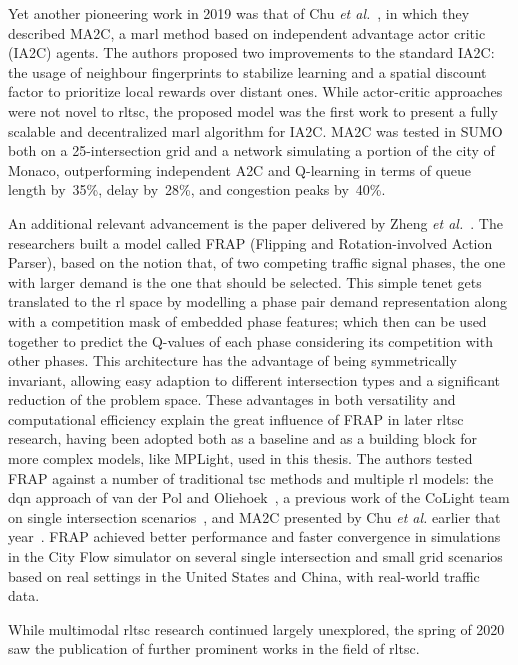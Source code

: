 Yet another pioneering work in 2019 was that of Chu \textit{et al.}~\cite{Chu2019}, in which they described MA2C, a \gls{marl} method based on independent advantage actor critic (IA2C) agents. The authors proposed two improvements to the standard IA2C: the usage of neighbour fingerprints to stabilize learning and a spatial discount factor to prioritize local rewards over distant ones. While actor-critic approaches were not novel to \gls{rltsc}, the proposed model was the first work to present a fully scalable and decentralized \gls{marl} algorithm for IA2C. MA2C was tested in SUMO both on a 25-intersection grid and a network simulating a portion of the city of Monaco, outperforming independent A2C and Q-learning in terms of queue length by~35\%, delay by~28\%, and congestion peaks by~40\%.

An additional relevant advancement is the paper delivered by Zheng \textit{et al.}~\cite{Zheng2019}. The researchers built a model called FRAP (Flipping and Rotation-involved Action Parser), based on the notion that, of two competing traffic signal phases, the one with larger demand is the one that should be selected. This simple tenet gets translated to the \gls{rl} space by modelling a phase pair demand representation along with a competition mask of embedded phase features; which then can be used together to predict the Q-values of each phase considering its competition with other phases. This architecture has the advantage of being symmetrically invariant, allowing easy adaption to different intersection types and a significant reduction of the problem space. These advantages in both versatility and computational efficiency explain the great influence of FRAP in later \gls{rltsc} research, having been adopted both as a baseline and as a building block for more complex models, like MPLight, used in this thesis. The authors tested FRAP against a number of traditional \gls{tsc} methods and multiple \gls{rl} models: the \gls{dqn} approach of van der Pol and Oliehoek~\cite{vanderPol2016}, a previous work of the CoLight team on single intersection scenarios~\cite{Wei2018}, and MA2C presented by Chu \textit{et al.} earlier that year~\cite{Chu2019}. FRAP achieved better performance and faster convergence in simulations in the City Flow simulator on several single intersection and small grid scenarios based on real settings in the United States and China, with real-world traffic data.

\medskip

\noindent While multimodal \gls{rltsc} research continued largely unexplored, the spring of 2020 saw the publication of further prominent works in the field of \gls{rltsc}.

